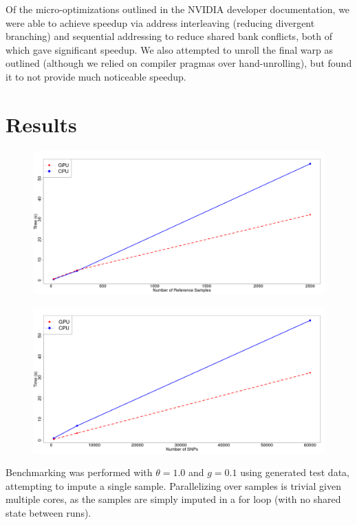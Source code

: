 \documentclass[12pt]{article}
\begin{document}
Of the micro-optimizations outlined in the NVIDIA developer
documentation\cite{reduceopt}, we were able to achieve speedup via address
interleaving (reducing divergent branching) and sequential addressing to reduce
shared bank conflicts, both of which gave significant speedup. We also
attempted to unroll the final warp as outlined (although we relied on compiler
pragmas over hand-unrolling), but found it to not provide much noticeable
speedup.

\newpage
\section{Results}

{
\begin{figure}[!hb]
  \includegraphics[scale=0.2]{sample}
\end{figure}
\begin{figure}[!hb]
  \includegraphics[scale=0.2]{snp}
\end{figure}
}

Benchmarking was performed with $\theta = 1.0$ and $g = 0.1$ using generated
test data, attempting to impute a single sample. Parallelizing over samples is
trivial given multiple cores, as the samples are simply imputed in a for loop
(with no shared state between runs).
\end{document}
